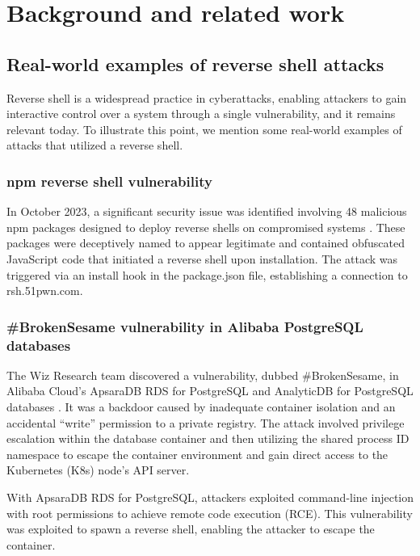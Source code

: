 \chapter{Background and related work}

\label{chap:background}



\section{Real-world examples of reverse shell attacks}

Reverse shell is a widespread practice in cyberattacks, enabling attackers to gain interactive control over a system through a single vulnerability, and it remains relevant today. To illustrate this point, we mention some real-world examples of attacks that utilized a reverse shell. 


\subsection*{npm reverse shell vulnerability}

In October 2023, a significant security issue was identified involving 48 malicious npm packages designed to deploy reverse shells on compromised systems \cite{npm-vulnerability}. These packages were deceptively named to appear legitimate and contained obfuscated JavaScript code that initiated a reverse shell upon installation. The attack was triggered via an install hook in the package.json file, establishing a connection to rsh.51pwn.com.


\subsection*{\#BrokenSesame vulnerability in Alibaba PostgreSQL databases}

The Wiz Research team discovered a vulnerability, dubbed \#BrokenSesame, in Alibaba Cloud's ApsaraDB RDS for PostgreSQL and AnalyticDB for PostgreSQL databases \cite{BrokenSesame}. It was a backdoor caused by inadequate container isolation and an accidental ``write'' permission to a private registry. The attack involved privilege escalation within the database container and then utilizing the shared process ID namespace to escape the container environment and gain direct access to the Kubernetes (K8s) node's API server.

With ApsaraDB RDS for PostgreSQL, attackers exploited command-line injection with root permissions to achieve remote code execution (RCE). This vulnerability was exploited to spawn a reverse shell, enabling the attacker to escape the container.

